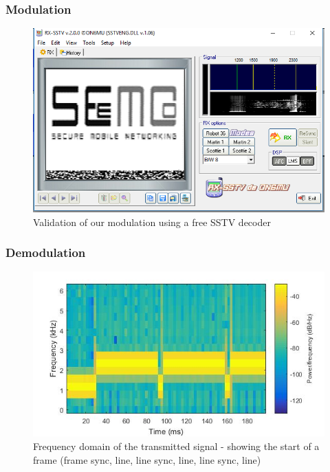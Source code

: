 \subsubsection{Modulation}
\begin{figure}
	\centering
	\includegraphics[width=1.0\linewidth]{gfx/screenshot_rxsstv.png}
	\caption{Validation of our modulation using a free SSTV decoder \cite{rxsstv}}
	\label{fig:impl:sstv:rxsstv}
\end{figure}

\subsubsection{Demodulation}

\begin{figure}
	\centering
	\includegraphics[width=1.0\linewidth]{gfx/sstv_nice.jpg}
	\caption{Frequency domain of the transmitted signal - showing the start of a frame (frame sync, line, line sync, line, line sync, line)}
	\label{fig:impl:sstv:spectro_tx}
\end{figure}

